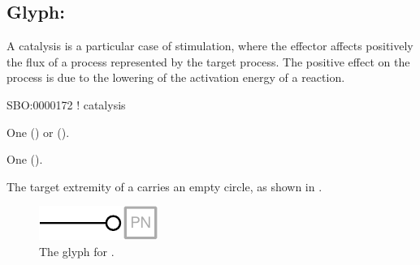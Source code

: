 \subsection{Glyph: }
\label{sec:catalysis}

A catalysis is a particular case of stimulation, where the effector affects positively the flux of a process represented by the target process. The positive effect on the process is due to the lowering of the activation energy of a reaction.

\begin{glyphDescription}

\glyphSboTerm
SBO:0000172 ! catalysis

\glyphOrigin
One  () or  ().

\glyphTarget
One  ().

\glyphSymbol
The target extremity of a  carries an empty circle, as shown in .

\end{glyphDescription}

\begin{figure}[H]
  \centering
  \includegraphics{images/build/catalysis.pdf}
  \caption{The \PD glyph for .}
  \label{fig:catalysis}
\end{figure}
